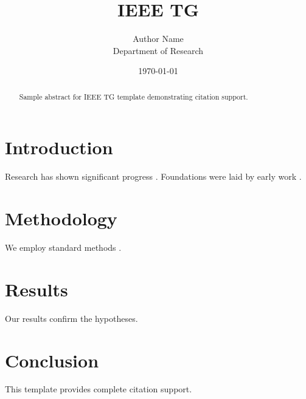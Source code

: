 ﻿\documentclass{IEEEtran}
\title{IEEE TG}
\author{Author Name \\ \small Department of Research}
\date{\today}
\begin{document}
\maketitle

\begin{abstract}
Sample abstract for IEEE TG template demonstrating citation support.
\end{abstract}

\section{Introduction}
Research has shown significant progress \citep{einstein1905}. Foundations were laid by early work \citep{turing1950}.

\section{Methodology}
We employ standard methods \citep{knuth1984}.

\section{Results}
Our results confirm the hypotheses.

\section{Conclusion}
This template provides complete citation support.



\end{document}
